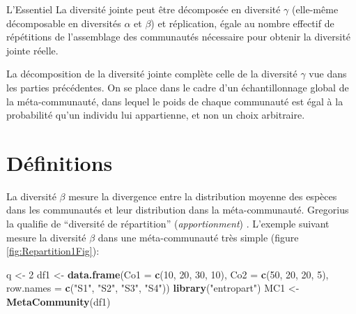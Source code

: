 \documentclass[
  11pt,
  french,
  a4paper,
  extrafontsizes,onecolumn,openright
  ]{memoir}
\newenvironment{Shaded}{\begin{snugshade}}{\end{snugshade}}
\newcommand{\DataTypeTok}[1]{\textcolor[rgb]{0.13,0.29,0.53}{#1}}
\newcommand{\DecValTok}[1]{\textcolor[rgb]{0.00,0.00,0.81}{#1}}
\newcommand{\KeywordTok}[1]{\textcolor[rgb]{0.13,0.29,0.53}{\textbf{#1}}}
\newcommand{\NormalTok}[1]{#1}
\newcommand{\StringTok}[1]{\textcolor[rgb]{0.31,0.60,0.02}{#1}}
\newenvironment{Summary}
  {\begin{bclogo}[logo=\bctrombone, noborder=true, couleur=lightgray!50]{L'Essentiel}\parindent0pt}
  {\end{bclogo}}
\begin{document}
\begin{Summary}
La diversité jointe peut être décomposée en diversité \(\gamma\)
(elle-même décomposable en diversités \(\alpha\) et \(\beta\)) et
réplication, égale au nombre effectif de répétitions de l'assemblage des
communautés nécessaire pour obtenir la diversité jointe réelle.
\end{Summary}

\normalsize

La décomposition de la diversité jointe \autocite{Gregorius2009a,Gregorius2010} complète celle de la diversité \(\gamma\) vue dans les parties précédentes.
On se place dans le cadre d'un échantillonnage global de la méta-communauté, dans lequel le poids de chaque communauté est égal à la probabilité qu'un individu lui appartienne, et non un choix arbitraire.

\hypertarget{sec:Definitions}{%
\section{Définitions}\label{sec:Definitions}}

La diversité \(\beta\) mesure la divergence entre la distribution moyenne des espèces dans les communautés et leur distribution dans la méta-communauté.
Gregorius la qualifie de \enquote{diversité de répartition} (\emph{apportionment}) \autocite{Gregorius2014}.
L'exemple suivant mesure la diversité \(\beta\) dans une méta-communauté très simple (figure \ref{fig:Repartition1Fig}):

\scriptsize

\begin{Shaded}
\begin{Highlighting}[]
\NormalTok{q <-}\StringTok{ }\DecValTok{2}
\NormalTok{df1 <-}\StringTok{ }\KeywordTok{data.frame}\NormalTok{(}\DataTypeTok{Co1 =} \KeywordTok{c}\NormalTok{(}\DecValTok{10}\NormalTok{, }\DecValTok{20}\NormalTok{, }\DecValTok{30}\NormalTok{, }\DecValTok{10}\NormalTok{), }\DataTypeTok{Co2 =} \KeywordTok{c}\NormalTok{(}\DecValTok{50}\NormalTok{, }\DecValTok{20}\NormalTok{, }\DecValTok{20}\NormalTok{, }
    \DecValTok{5}\NormalTok{), }\DataTypeTok{row.names =} \KeywordTok{c}\NormalTok{(}\StringTok{"S1"}\NormalTok{, }\StringTok{"S2"}\NormalTok{, }\StringTok{"S3"}\NormalTok{, }\StringTok{"S4"}\NormalTok{))}
\KeywordTok{library}\NormalTok{(}\StringTok{"entropart"}\NormalTok{)}
\NormalTok{MC1 <-}\StringTok{ }\KeywordTok{MetaCommunity}\NormalTok{(df1)}
\end{Highlighting}
\end{Shaded}
\end{document}
